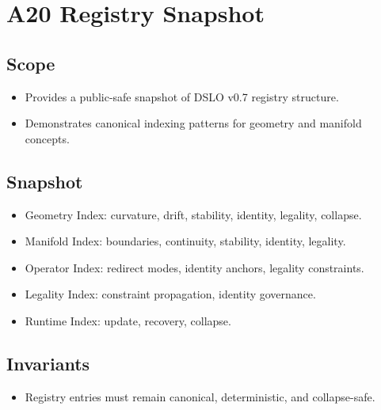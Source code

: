 \section{A20 Registry Snapshot}

\subsection{Scope}
\begin{itemize}
    \item Provides a public-safe snapshot of DSLO v0.7 registry structure.
    \item Demonstrates canonical indexing patterns for geometry and manifold concepts.
\end{itemize}

\subsection{Snapshot}
\begin{itemize}
    \item Geometry Index: curvature, drift, stability, identity, legality, collapse.
    \item Manifold Index: boundaries, continuity, stability, identity, legality.
    \item Operator Index: redirect modes, identity anchors, legality constraints.
    \item Legality Index: constraint propagation, identity governance.
    \item Runtime Index: update, recovery, collapse.
\end{itemize}

\subsection{Invariants}
\begin{itemize}
    \item Registry entries must remain canonical, deterministic, and collapse-safe.
\end{itemize}

